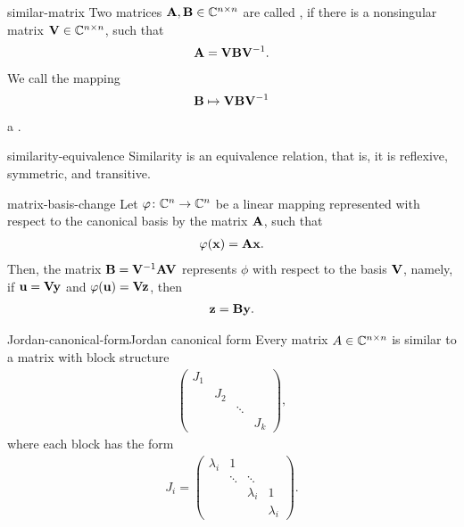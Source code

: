 \begin{Definition}{similar-matrix}
  Two matrices $\mathbf A,\mathbf B\in\mathbb C^{n\times n}$ are called , if there is a nonsingular matrix $\mathbf V\in\mathbb C^{n\times n}$, such that
  \begin{gather}
      \mathbf A = \mathbf V \mathbf B \mathbf V^{-1}.
  \end{gather}
  We call the mapping
  \begin{gather}
      \mathbf B \mapsto \mathbf V \mathbf B \mathbf V^{-1}
  \end{gather}
  a .
\end{Definition}

\begin{Lemma}{similarity-equivalence}
  Similarity is an equivalence relation, that is, it is reflexive,
  symmetric, and transitive.
\end{Lemma}

\begin{Lemma}{matrix-basis-change}
  Let $\varphi\colon \mathbb C^n\to \mathbb C^n$ be a linear mapping represented with
  respect to the canonical basis by the matrix $\mathbf A$, such that
  \begin{gather}
    \varphi(\mathbf x) = \mathbf A \mathbf x.
  \end{gather}
  Then, the matrix $\mathbf B = \mathbf V^{-1}\mathbf A\mathbf V$ represents $\phi$
  with respect to the basis $\mathbf V$, namely, if $\mathbf u = \mathbf V \mathbf y$ and
  $\varphi(\mathbf u) = \mathbf V \mathbf z$, then
  \begin{gather}
    \mathbf z = \mathbf B \mathbf y.
  \end{gather}
\end{Lemma}

\begin{Theorem*}{Jordan-canonical-form}{Jordan canonical form}
  Every matrix $A\in\mathbb C^{n\times n}$ is similar to a matrix with block structure
  \begin{gather}
    \begin{pmatrix}
      J_1\\&J_2\\&&\ddots\\&&&J_k
    \end{pmatrix},
  \end{gather}
  where each block has the form
  \begin{gather}
    J_i = \begin{pmatrix}
      \lambda_i&1\\&\ddots&\ddots\\
      &&\lambda_i&1\\
      &&&\lambda_i
    \end{pmatrix}.
  \end{gather}
\end{Theorem*}


